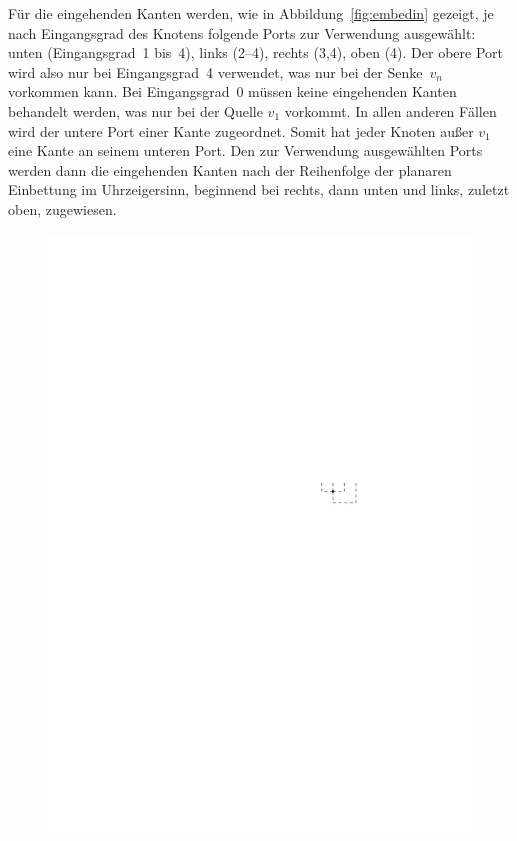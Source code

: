 \documentclass[a4paper]{scrreprt}
\theoremstyle{definition}
\begin{document}
Für die eingehenden Kanten werden, wie in Abbildung~\ref{fig:embedin} gezeigt, je nach Eingangsgrad des Knotens folgende Ports zur Verwendung ausgewählt: unten (Eingangsgrad~1 bis~4), links (2--4), rechts (3,4), oben (4). Der obere Port wird also nur bei Eingangsgrad~4 verwendet, was nur bei der Senke~$v_n$ vorkommen kann. Bei Eingangsgrad~0 müssen keine eingehenden Kanten behandelt werden, was nur bei der Quelle $v_1$ vorkommt. In allen anderen Fällen wird der untere Port einer Kante zugeordnet. Somit hat jeder Knoten außer $v_1$ eine Kante an seinem unteren Port. Den zur Verwendung ausgewählten Ports werden dann die eingehenden Kanten nach der Reihenfolge der planaren Einbettung im Uhrzeigersinn, beginnend bei rechts, dann unten und links, zuletzt oben, zugewiesen.

\begin{figure}[h]
        \centering
            {\includegraphics[scale=.8]{oc3_embed/incoming/indeg0}}

\end{figure}
\end{document}

